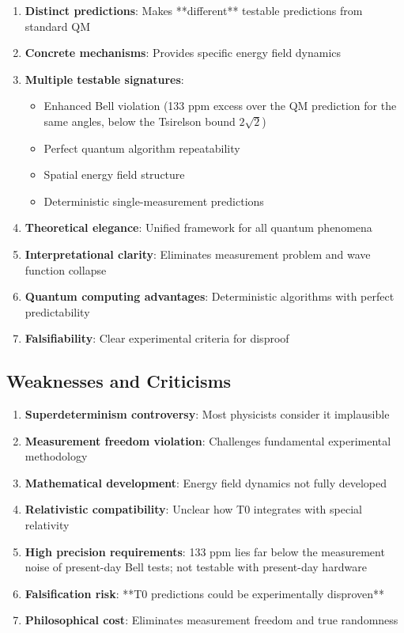 	\begin{enumerate}
		\item \textbf{Distinct predictions}: Makes **different** testable predictions from standard QM
		\item \textbf{Concrete mechanisms}: Provides specific energy field dynamics
		\item \textbf{Multiple testable signatures}: 
		\begin{itemize}
			\item Enhanced Bell violation (133 ppm excess over the QM prediction for the same angles, below the Tsirelson bound $2\sqrt2$)
			\item Perfect quantum algorithm repeatability  
			\item Spatial energy field structure
			\item Deterministic single-measurement predictions
		\end{itemize}
		\item \textbf{Theoretical elegance}: Unified framework for all quantum phenomena
		\item \textbf{Interpretational clarity}: Eliminates measurement problem and wave function collapse
		\item \textbf{Quantum computing advantages}: Deterministic algorithms with perfect predictability
		\item \textbf{Falsifiability}: Clear experimental criteria for disproof
	\end{enumerate}
	
	\subsection{Weaknesses and Criticisms}
	
	\begin{enumerate}
		\item \textbf{Superdeterminism controversy}: Most physicists consider it implausible
		\item \textbf{Measurement freedom violation}: Challenges fundamental experimental methodology
		\item \textbf{Mathematical development}: Energy field dynamics not fully developed
		\item \textbf{Relativistic compatibility}: Unclear how T0 integrates with special relativity
		\item \textbf{High precision requirements}: 133 ppm lies far below the measurement noise of present-day Bell tests; not testable with present-day hardware
		\item \textbf{Falsification risk}: **T0 predictions could be experimentally disproven**
		\item \textbf{Philosophical cost}: Eliminates measurement freedom and true randomness
	\end{enumerate}
	
